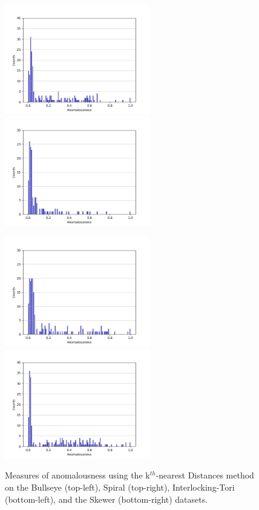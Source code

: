 \begin{figure}[!t]
\centering
\includegraphics[width=2.5in]{static/bullseye_kth_nearest.png}\includegraphics[width=2.5in]{static/spiral_kth_nearest.png}

\includegraphics[width=2.5in]{static/interlocking_tori_kth_nearest.png}\includegraphics[width=2.5in]{static/skewer_kth_nearest.png}

\caption{
Measures of anomalousness using the k$^{th}$-nearest Distances method on the Bullseye (top-left), Spiral (top-right), Interlocking-Tori (bottom-left), and the Skewer (bottom-right) datasets.
}

\label{results:histograms:kth_nearest}
\end{figure}


